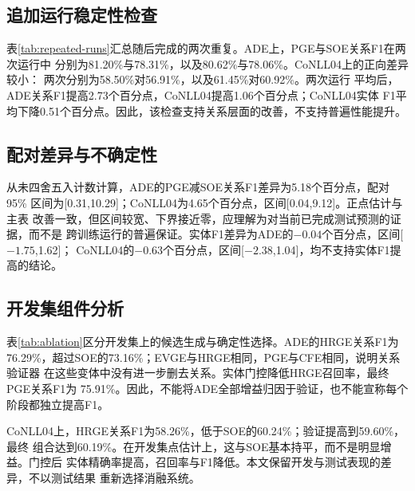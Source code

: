\documentclass[12pt,a4paper,fontset=none]{ctexart}
\begin{document}
\subsection{追加运行稳定性检查}
表\ref{tab:repeated-runs}汇总随后完成的两次重复。ADE上，PGE与SOE关系F1在两次运行中
分别为81.20\%与78.31\%，以及80.62\%与78.06\%。CoNLL04上的正向差异较小：
两次分别为58.50\%对56.91\%，以及61.45\%对60.92\%。两次运行
平均后，ADE关系F1提高2.73个百分点，CoNLL04提高1.06个百分点；CoNLL04实体
F1平均下降0.51个百分点。因此，该检查支持关系层面的改善，不支持普遍性能提升。

\begin{table}[htbp]
\centering\small\setlength{\tabcolsep}{4pt}
\caption{两次追加训练运行的测试稳定性，统一严格跨度评估器下的微平均分数
（\%，均值$\pm$样本标准差，$n=2$）。末列为PGE减SOE的平均关系F1差异。}
\label{tab:repeated-runs}

\end{table}

\subsection{配对差异与不确定性}
从未四舍五入计数计算，ADE的PGE减SOE关系F1差异为5.18个百分点，配对95\%
区间为[0.31,10.29]；CoNLL04为4.65个百分点，区间[0.04,9.12]。正点估计与主表
改善一致，但区间较宽、下界接近零，应理解为对当前已完成测试预测的证据，而不是
跨训练运行的普遍保证。实体F1差异为ADE的$-0.04$个百分点，区间[$-1.75$,1.62]；
CoNLL04的$-0.63$个百分点，区间[$-2.38$,1.04]，均不支持实体F1提高的结论。

\subsection{开发集组件分析}
表\ref{tab:ablation}区分开发集上的候选生成与确定性选择。ADE的HRGE关系F1为
76.29\%，超过SOE的73.16\%；EVGE与HRGE相同，PGE与CFE相同，说明关系验证器
在这些变体中没有进一步删去关系。实体门控降低HRGE召回率，最终PGE关系F1为
75.91\%。因此，不能将ADE全部增益归因于验证，也不能宣称每个阶段都独立提高F1。

CoNLL04上，HRGE关系F1为58.26\%，低于SOE的60.24\%；验证提高到59.60\%，最终
组合达到60.19\%。在开发集点估计上，这与SOE基本持平，而不是明显增益。门控后
实体精确率提高，召回率与F1降低。本文保留开发与测试表现的差异，不以测试结果
重新选择消融系统。
\begin{table}[htbp]
\centering\scriptsize\setlength{\tabcolsep}{3pt}
\caption{统一严格跨度评估器下的开发集消融（微平均\%）。这些行用于分析固定
架构，不代表额外测试系统。}
\label{tab:ablation}

\end{table}
\end{document}
